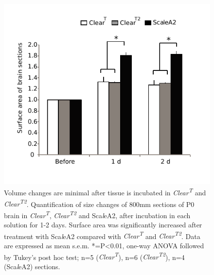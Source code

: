 \begin{figure}[hbtp]
    \begin{center}
        \includegraphics{Figures/ClearT_SFig1}
        \caption[Volume changes are minimal after tissue is incubated in \emph{Clear\textsuperscript{T}} and \emph{Clear\textsuperscript{T2}}.]
        {Volume changes are minimal after tissue is incubated in \emph{Clear\textsuperscript{T}} and \emph{Clear\textsuperscript{T2}}.
		Quantification of size changes of 800mm sections of P0 brain in \emph{Clear\textsuperscript{T}}, \emph{Clear\textsuperscript{T2}} and Sca\emph{l}eA2, after incubation in each solution for 1-2 days.
		Surface area was significantly increased after treatment with Sca\emph{l}eA2 compared with \emph{Clear\textsuperscript{T}} and \emph{Clear\textsuperscript{T2}}.
		Data are expressed as mean \pm s.e.m.
		*=P<0.01, one-way ANOVA followed by Tukey’s post hoc test; n=5 (\emph{Clear\textsuperscript{T}}), n=6 (\emph{Clear\textsuperscript{T2}}), n=4 (Sca\emph{l}eA2) sections.
		}
        \label{ClearT_SFig1}
    \end{center}
\end{figure}